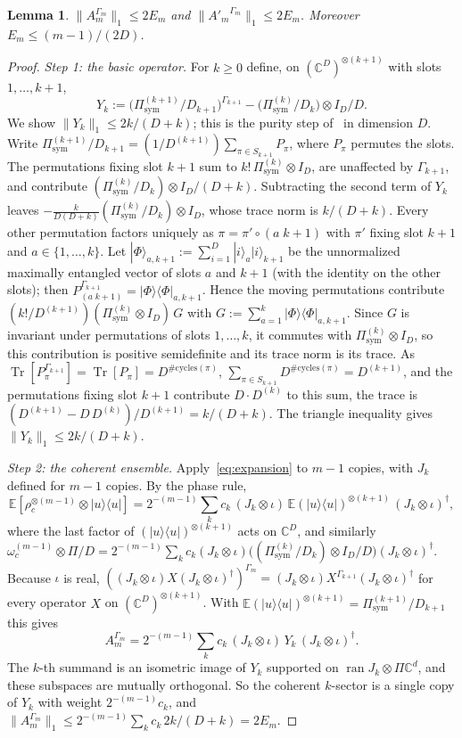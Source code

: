 \documentclass[pdflatex,sn-mathphys-num]{sn-jnl}%
\theoremstyle{thmstyleone}
\newtheorem{lemma}[theorem]{Lemma}
\theoremstyle{thmstylethree}
\theoremstyle{thmstyletwo}
\newcommand{\Tr}{\operatorname{Tr}}
\newcommand{\ran}{\operatorname{ran}}
\newcommand{\E}{\mathbb{E}}
\newcommand{\ket}[1]{|#1\rangle}
\newcommand{\bra}[1]{\langle #1|}
\newcommand{\sym}{\mathrm{sym}}
\newcommand{\C}{\mathbb{C}}
\begin{document}
\begin{lemma}\label{lem:purity}
$\|A_m^{\Gamma_m}\|_1\le2E_m$ and $\|{A'_m}^{\Gamma_m}\|_1\le2E_m$. Moreover $E_m\le(m-1)/(2D)$.
\end{lemma}
\begin{proof}
\emph{Step 1: the basic operator.} For $k\ge0$ define, on $(\C^D)^{\otimes(k+1)}$ with slots $1,\dots,k+1$,
\[
Y_k:=\bigl(\Pi^{(k+1)}_\sym/D_{k+1}\bigr)^{\Gamma_{k+1}}-\bigl(\Pi^{(k)}_\sym/D_k\bigr)\otimes I_D/D .
\]
We show $\|Y_k\|_1\le2k/(D+k)$; this is the purity step of~\cite{ab} in dimension $D$. Write
$\Pi^{(k+1)}_\sym/D_{k+1}=(1/D^{(k+1)})\sum_{\pi\in S_{k+1}}P_\pi$, where $P_\pi$ permutes the slots. The permutations
fixing slot $k+1$ sum to $k!\,\Pi^{(k)}_\sym\otimes I_D$, are unaffected by $\Gamma_{k+1}$, and contribute
$(\Pi^{(k)}_\sym/D_k)\otimes I_D/(D+k)$. Subtracting the second term of $Y_k$ leaves
$-\frac{k}{D(D+k)}(\Pi^{(k)}_\sym/D_k)\otimes I_D$, whose trace norm is $k/(D+k)$. Every other permutation factors
uniquely as $\pi=\pi'\circ(a\;k{+}1)$ with $\pi'$ fixing slot $k+1$ and $a\in\{1,\dots,k\}$. Let
$\ket\Phi_{a,k+1}:=\sum_{i=1}^D\ket i_a\ket i_{k+1}$ be the unnormalized maximally entangled vector of slots $a$ and
$k+1$ (with the identity on the other slots); then $P_{(a\;k+1)}^{\Gamma_{k+1}}=\ket\Phi\bra\Phi_{a,k+1}$. Hence the
moving permutations contribute $(k!/D^{(k+1)})(\Pi^{(k)}_\sym\otimes I_D)\,G$ with $G:=\sum_{a=1}^k\ket\Phi\bra\Phi_{a,k+1}$.
Since $G$ is invariant under permutations of slots $1,\dots,k$, it commutes with $\Pi^{(k)}_\sym\otimes I_D$, so this
contribution is positive semidefinite and its trace norm is its trace. As $\Tr[P_\pi^{\Gamma_{k+1}}]=\Tr[P_\pi]=
D^{\#\mathrm{cycles}(\pi)}$, $\sum_{\pi\in S_{k+1}}D^{\#\mathrm{cycles}(\pi)}=D^{(k+1)}$, and the permutations fixing
slot $k+1$ contribute $D\cdot D^{(k)}$ to this sum, the trace is $(D^{(k+1)}-D\,D^{(k)})/D^{(k+1)}=k/(D+k)$. The
triangle inequality gives $\|Y_k\|_1\le2k/(D+k)$.

\emph{Step 2: the coherent ensemble.} Apply~\eqref{eq:expansion} to $m-1$ copies, with $J_k$ defined for $m-1$ copies.
By the phase rule,
\[
\E[\rho_c^{\otimes(m-1)}\otimes\ket u\bra u]=2^{-(m-1)}\sum_kc_k\,(J_k\otimes\iota)\,\E(\ket u\bra u)^{\otimes(k+1)}\,
(J_k\otimes\iota)^\dagger,
\]
where the last factor of $(\ket u\bra u)^{\otimes(k+1)}$ acts on $\C^D$, and similarly
$\omega_c^{(m-1)}\otimes\Pi/D=2^{-(m-1)}\sum_kc_k(J_k\otimes\iota)\bigl((\Pi^{(k)}_\sym/D_k)\otimes
I_D/D\bigr)(J_k\otimes\iota)^\dagger$. Because $\iota$ is real, $((J_k\otimes\iota)X(J_k\otimes\iota)^\dagger)^{\Gamma_m}
=(J_k\otimes\iota)X^{\Gamma_{k+1}}(J_k\otimes\iota)^\dagger$ for every operator $X$ on $(\C^D)^{\otimes(k+1)}$. With
$\E(\ket u\bra u)^{\otimes(k+1)}=\Pi^{(k+1)}_\sym/D_{k+1}$ this gives
\[
A_m^{\Gamma_m}=2^{-(m-1)}\sum_kc_k\,(J_k\otimes\iota)\,Y_k\,(J_k\otimes\iota)^\dagger .
\]
The $k$-th summand is an isometric image of $Y_k$ supported on $\ran J_k\otimes\Pi\C^d$, and these subspaces are mutually
orthogonal. So the coherent $k$-sector is a single copy of $Y_k$ with weight $2^{-(m-1)}c_k$, and
$\|A_m^{\Gamma_m}\|_1\le2^{-(m-1)}\sum_kc_k\,2k/(D+k)=2E_m$.


\end{proof}
\end{document}
